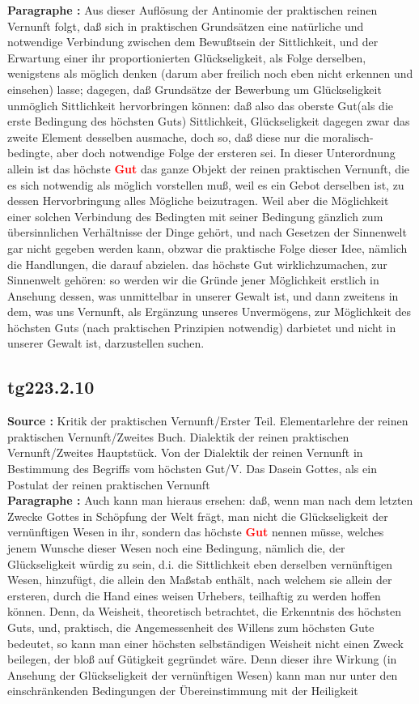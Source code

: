 \documentclass[a4paper,12pt,twoside]{book}
\newcommand{\match}[1]{\textcolor{red}{\textbf{#1}}}
\begin{document}
	\noindent\textbf{Paragraphe : }Aus dieser Auflösung der Antinomie der praktischen reinen Vernunft folgt, daß sich in praktischen Grundsätzen eine natürliche und notwendige Verbindung zwischen dem Bewußtsein der Sittlichkeit, und der Erwartung einer ihr proportionierten Glückseligkeit, als Folge derselben, wenigstens als möglich denken (darum aber freilich noch eben nicht erkennen und einsehen) lasse; dagegen, daß Grundsätze der Bewerbung um Glückseligkeit unmöglich Sittlichkeit hervorbringen können: daß also das oberste Gut(als die erste Bedingung des höchsten Guts) Sittlichkeit, Glückseligkeit dagegen zwar das zweite Element desselben ausmache, doch so, daß diese nur die moralisch-bedingte, aber doch notwendige Folge der ersteren sei. In dieser Unterordnung allein ist das höchste \match{Gut} das ganze Objekt der reinen praktischen Vernunft, die es sich notwendig als möglich vorstellen muß, weil es ein Gebot derselben ist, zu dessen Hervorbringung alles Mögliche beizutragen. Weil aber die Möglichkeit einer solchen Verbindung des Bedingten mit seiner Bedingung gänzlich zum übersinnlichen Verhältnisse der Dinge gehört, und nach Gesetzen der Sinnenwelt gar nicht gegeben werden kann, obzwar die praktische Folge dieser Idee, nämlich die Handlungen, die darauf abzielen. das höchste Gut wirklichzumachen, zur Sinnenwelt gehören: so werden wir die Gründe jener Möglichkeit erstlich in Ansehung dessen, was unmittelbar in unserer Gewalt ist, und dann zweitens in dem, was uns Vernunft, als Ergänzung unseres Unvermögens, zur Möglichkeit des höchsten Guts (nach praktischen Prinzipien notwendig) darbietet und nicht in unserer Gewalt ist, darzustellen suchen. 
	
	\subsection*{tg223.2.10} 
	\textbf{Source : }Kritik der praktischen Vernunft/Erster Teil. Elementarlehre der reinen praktischen Vernunft/Zweites Buch. Dialektik der reinen praktischen Vernunft/Zweites Hauptstück. Von der Dialektik der reinen Vernunft in Bestimmung des Begriffs vom höchsten Gut/V. Das Dasein Gottes, als ein Postulat der reinen praktischen Vernunft\\  
	
	\noindent\textbf{Paragraphe : }Auch kann man hieraus ersehen: daß, wenn man nach dem letzten Zwecke Gottes in Schöpfung der Welt frägt, man nicht die Glückseligkeit der vernünftigen Wesen in ihr, sondern das höchste \match{Gut} nennen müsse, welches jenem Wunsche dieser Wesen noch eine Bedingung, nämlich die, der Glückseligkeit würdig zu sein, d.i. die Sittlichkeit eben derselben vernünftigen Wesen, hinzufügt, die allein den Maßstab enthält, nach welchem sie allein der ersteren, durch die Hand eines weisen Urhebers, teilhaftig zu werden hoffen können. Denn, da Weisheit, theoretisch betrachtet, die Erkenntnis des höchsten Guts, und, praktisch, die Angemessenheit des Willens zum höchsten Gute bedeutet, so kann man einer höchsten selbständigen Weisheit nicht einen Zweck beilegen, der bloß auf Gütigkeit gegründet wäre. Denn dieser ihre Wirkung (in Ansehung der Glückseligkeit der vernünftigen Wesen)  kann man nur unter den einschränkenden Bedingungen der Übereinstimmung mit der Heiligkeit
	
\end{document}
